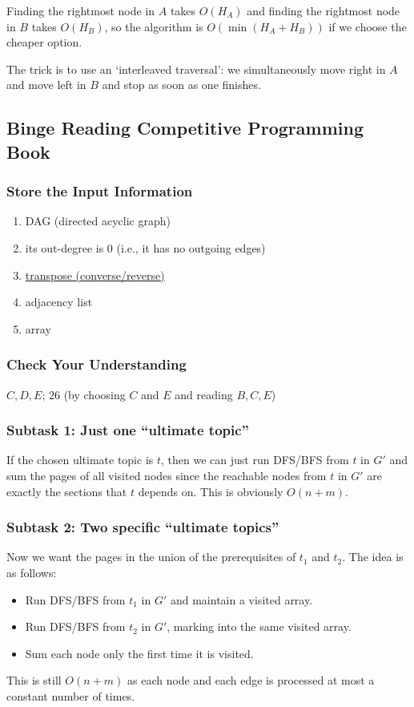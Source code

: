 \documentclass[12pt]{article}
\begin{document}
Finding the rightmost node in $A$ takes $O\left(H_A\right)$ and finding the rightmost node in $B$ takes $O\left(H_B\right)$, so the algorithm is $O\left(\min(H_A+H_B)\right)$ if we choose the cheaper option.

The trick is to use an `interleaved traversal': we simultaneously move right in $A$ and move left in $B$ and stop as soon as one finishes.
\subsection{Binge Reading Competitive Programming Book}
\subsubsection{Store the Input Information}
\begin{enumerate}
\item DAG (directed acyclic graph)
\item its out-degree is $0$ (i.e., it has no outgoing edges)
\item \href{https://en.wikipedia.org/wiki/Transpose_graph}{transpose (converse/reverse)}
\item adjacency list
\item array
\end{enumerate}
\subsubsection{Check Your Understanding}
$C,D,E$; $26$ (by choosing $C$ and $E$ and reading $B,C,E$)
\subsubsection{Subtask 1: Just one “ultimate topic”}
If the chosen ultimate topic is $t$, then we can just run DFS/BFS from $t$ in $G'$ and sum the pages of all visited nodes since the reachable nodes from $t$ in $G'$ are exactly the sections that $t$ depends on. This is obviously $O(n+m)$.
\subsubsection{Subtask 2: Two specific “ultimate topics”}
Now we want the pages in the union of the prerequisites of $t_1$ and $t_2$. The idea is as follows:
\begin{itemize}
\item Run DFS/BFS from $t_1$ in $G'$ and maintain a visited array.
\item Run DFS/BFS from $t_2$ in $G'$, marking into the same visited array.
\item Sum each node only the first time it is visited.
\end{itemize}
This is still $O(n+m)$ as each node and each edge is processed at most a constant number of times.
\end{document}
